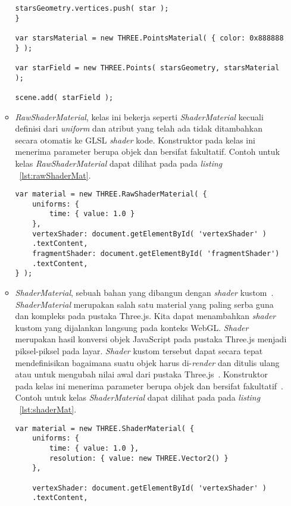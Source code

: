 \begin{itemize}
\begin{itemize}
\begin{lstlisting}[caption={Contoh penggunaan kelas {\it PointsMaterial}.}, label={lst:pointsMat},captionpos=b]
	starsGeometry.vertices.push( star );
}

var starsMaterial = new THREE.PointsMaterial( { color: 0x888888 } );

var starField = new THREE.Points( starsGeometry, starsMaterial );

scene.add( starField );
\end{lstlisting}
		\item {\it RawShaderMaterial}, kelas ini bekerja seperti {\it ShaderMaterial} kecuali definisi dari {\it uniform} dan atribut yang telah ada tidak ditambahkan secara otomatis ke GLSL {\it shader} kode. Konstruktor pada kelas ini menerima parameter berupa objek dan bersifat fakultatif. Contoh untuk kelas {\it RawShaderMaterial} dapat dilihat pada pada {\it listing} ~\ref{lst:rawShaderMat}.
\begin{lstlisting}[caption={Contoh penggunaan kelas {\it RawShaderMaterial}.}, label={lst:rawShaderMat},captionpos=b]
var material = new THREE.RawShaderMaterial( {
    uniforms: {
        time: { value: 1.0 }
    },
    vertexShader: document.getElementById( 'vertexShader' )
    .textContent,
    fragmentShader: document.getElementById( 'fragmentShader')
    .textContent,
} );
\end{lstlisting}
		\item {\it ShaderMaterial}, sebuah bahan yang dibangun dengan {\it shader} kustom~\cite{threejs}. {\it ShaderMaterial} merupakan salah satu material yang paling serba guna dan kompleks pada pustaka Three.js. Kita dapat menambahkan {\it shader} kustom yang dijalankan langsung pada konteks WebGL. {\it Shader} merupakan hasil konversi objek JavaScript pada pustaka Three.js menjadi piksel-piksel pada layar. {\it Shader} kustom tersebut dapat secara tepat mendefinisikan bagaimana suatu objek harus di-{\it render} dan ditulis ulang atau untuk mengubah nilai awal dari pustaka Three.js~\cite{learningThreejs}. Konstruktor pada kelas ini menerima parameter berupa objek dan bersifat fakultatif~\cite{threejs}. Contoh untuk kelas {\it ShaderMaterial} dapat dilihat pada pada {\it listing} ~\ref{lst:shaderMat}.
\begin{lstlisting}[caption={Contoh penggunaan kelas {\it ShaderMaterial}.}, label={lst:shaderMat},captionpos=b]
var material = new THREE.ShaderMaterial( {
	uniforms: {
		time: { value: 1.0 },
		resolution: { value: new THREE.Vector2() }
	},

	vertexShader: document.getElementById( 'vertexShader' )
	.textContent,


\end{lstlisting}
\end{itemize}
\end{itemize}
